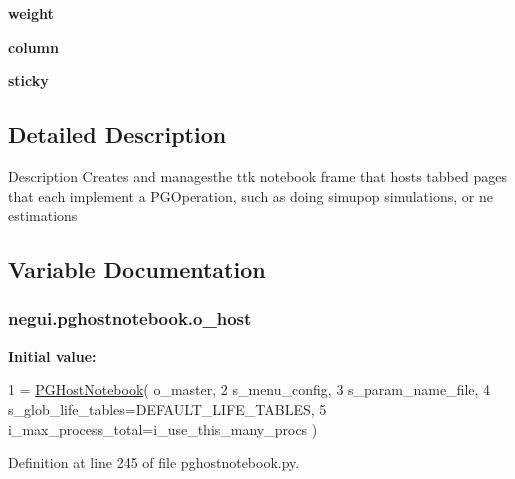 \begin{DoxyCompactItemize}
\item 
{\bfseries weight}\hypertarget{namespacenegui_1_1pghostnotebook_ad128d121aeac1b79c3f0f86d1fd8131c}{}\label{namespacenegui_1_1pghostnotebook_ad128d121aeac1b79c3f0f86d1fd8131c}

\item 
{\bfseries column}\hypertarget{namespacenegui_1_1pghostnotebook_a6c203ea581355857a12fad081c23c08a}{}\label{namespacenegui_1_1pghostnotebook_a6c203ea581355857a12fad081c23c08a}

\item 
{\bfseries sticky}\hypertarget{namespacenegui_1_1pghostnotebook_a5b7b1e279a09dd3ad592ac50862c7886}{}\label{namespacenegui_1_1pghostnotebook_a5b7b1e279a09dd3ad592ac50862c7886}

\end{DoxyCompactItemize}


\subsection{Detailed Description}
\begin{DoxyVerb}Description
Creates and managesthe ttk notebook frame
that hosts tabbed pages that each implement 
a PGOperation, such as doing simupop simulations,
or ne estimations
\end{DoxyVerb}
 

\subsection{Variable Documentation}
\subsubsection[{\texorpdfstring{o\+\_\+host}{o_host}}]{\setlength{\rightskip}{0pt plus 5cm}negui.\+pghostnotebook.\+o\+\_\+host}\hypertarget{namespacenegui_1_1pghostnotebook_a90452a51dfebcdcd89ed5eccb9094fe7}{}\label{namespacenegui_1_1pghostnotebook_a90452a51dfebcdcd89ed5eccb9094fe7}
{\bfseries Initial value\+:}
\begin{DoxyCode}
1 = \hyperlink{classnegui_1_1pghostnotebook_1_1PGHostNotebook}{PGHostNotebook}( o\_master, 
2             s\_menu\_config, 
3             s\_param\_name\_file, 
4             s\_glob\_life\_tables=DEFAULT\_LIFE\_TABLES,
5             i\_max\_process\_total=i\_use\_this\_many\_procs )
\end{DoxyCode}


Definition at line 245 of file pghostnotebook.\+py.

